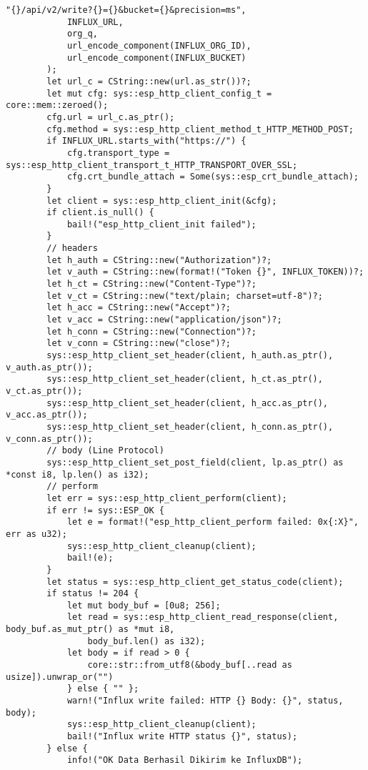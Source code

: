 \documentclass[a4paper, 12pt]{article}
\begin{document}
\begin{lstlisting}[style=ruststyle, caption={main.rs}, basicstyle=\ttfamily\tiny]
            "{}/api/v2/write?{}={}&bucket={}&precision=ms",
            INFLUX_URL,
            org_q,
            url_encode_component(INFLUX_ORG_ID),
            url_encode_component(INFLUX_BUCKET)
        );
        let url_c = CString::new(url.as_str())?;
        let mut cfg: sys::esp_http_client_config_t = core::mem::zeroed();
        cfg.url = url_c.as_ptr();
        cfg.method = sys::esp_http_client_method_t_HTTP_METHOD_POST;
        if INFLUX_URL.starts_with("https://") {
            cfg.transport_type = sys::esp_http_client_transport_t_HTTP_TRANSPORT_OVER_SSL;
            cfg.crt_bundle_attach = Some(sys::esp_crt_bundle_attach);
        }
        let client = sys::esp_http_client_init(&cfg);
        if client.is_null() {
            bail!("esp_http_client_init failed");
        }
        // headers
        let h_auth = CString::new("Authorization")?;
        let v_auth = CString::new(format!("Token {}", INFLUX_TOKEN))?;
        let h_ct = CString::new("Content-Type")?;
        let v_ct = CString::new("text/plain; charset=utf-8")?;
        let h_acc = CString::new("Accept")?;
        let v_acc = CString::new("application/json")?;
        let h_conn = CString::new("Connection")?;
        let v_conn = CString::new("close")?;
        sys::esp_http_client_set_header(client, h_auth.as_ptr(), v_auth.as_ptr());
        sys::esp_http_client_set_header(client, h_ct.as_ptr(), v_ct.as_ptr());
        sys::esp_http_client_set_header(client, h_acc.as_ptr(), v_acc.as_ptr());
        sys::esp_http_client_set_header(client, h_conn.as_ptr(), v_conn.as_ptr());
        // body (Line Protocol)
        sys::esp_http_client_set_post_field(client, lp.as_ptr() as *const i8, lp.len() as i32);
        // perform
        let err = sys::esp_http_client_perform(client);
        if err != sys::ESP_OK {
            let e = format!("esp_http_client_perform failed: 0x{:X}", err as u32);
            sys::esp_http_client_cleanup(client);
            bail!(e);
        }
        let status = sys::esp_http_client_get_status_code(client);
        if status != 204 {
            let mut body_buf = [0u8; 256];
            let read = sys::esp_http_client_read_response(client, body_buf.as_mut_ptr() as *mut i8,
                body_buf.len() as i32);
            let body = if read > 0 {
                core::str::from_utf8(&body_buf[..read as usize]).unwrap_or("")
            } else { "" };
            warn!("Influx write failed: HTTP {} Body: {}", status, body);
            sys::esp_http_client_cleanup(client);
            bail!("Influx write HTTP status {}", status);
        } else {
            info!("OK Data Berhasil Dikirim ke InfluxDB");

\end{lstlisting}
\end{document}
